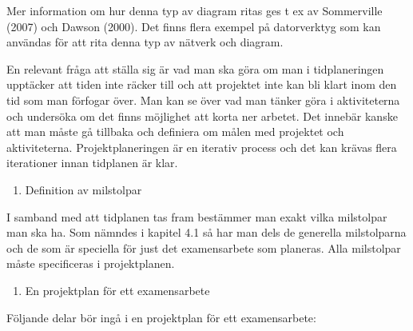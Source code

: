 Mer information om hur denna typ av diagram ritas ges t ex av
Sommerville (2007) och Dawson (2000). Det finns flera exempel på
datorverktyg som kan användas för att rita denna typ av nätverk och
diagram.

En relevant fråga att ställa sig är vad man ska göra om man i
tidplaneringen upptäcker att tiden inte räcker till och att projektet
inte kan bli klart inom den tid som man förfogar över. Man kan se över
vad man tänker göra i aktiviteterna och undersöka om det finns möjlighet
att korta ner arbetet. Det innebär kanske att man måste gå tillbaka och
definiera om målen med projektet och aktiviteterna. Projektplaneringen
är en iterativ process och det kan krävas flera iterationer innan
tidplanen är klar.

\begin{enumerate}
\def\labelenumi{\arabic{enumi}.}
\item
  Definition av milstolpar
\end{enumerate}

I samband med att tidplanen tas fram bestämmer man exakt vilka
milstolpar man ska ha. Som nämndes i kapitel 4.1 så har man dels de
generella milstolparna och de som är speciella för just det
examensarbete som planeras. Alla milstolpar måste specificeras i
projektplanen.

\begin{enumerate}
\def\labelenumi{\arabic{enumi}.}
\item
  En projektplan för ett examensarbete
\end{enumerate}

Följande delar bör ingå i en projektplan för ett examensarbete:

